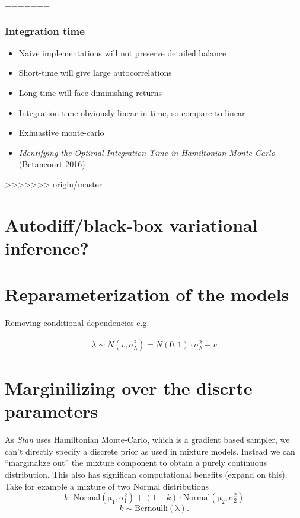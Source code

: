 \documentclass[11pt]{report}
\begin{document}
=======
\subsubsection{Integration time}

\begin{itemize}
\item Naive implementations will not preserve detailed balance
\item Short-time will give large autocorrelations
\item Long-time will face diminishing returns
\item Integration time obviously linear in time, so compare to linear
\item Exhuastive monte-carlo
\item \emph{Identifying the Optimal Integration Time in Hamiltonian Monte-Carlo} (Betancourt 2016)
\end{itemize}

>>>>>>> origin/master
\section{Autodiff/black-box variational inference?}

\section{Reparameterization of the models}

Removing conditional dependencies e.g.

\begin{align*}
\lambda \sim N(v, \sigma^2_\lambda) = N(0, 1) \cdot \sigma_\lambda^2 + v
\end{align*}

\section{Marginilizing over the discrte parameters}

As \emph{Stan} uses Hamiltonian Monte-Carlo, which is a gradient based sampler, we can't directly specify a discrete prior as used in mixture models. Instead we can ``marginalize out'' the mixture component to obtain a purely continuous distribution. This also has significan computational benefits (expand on this). \\

Take for example a mixture of two Normal distributions
\begin{equation}
  k \cdot \operatorname{Normal(\mu_1, \sigma_1^2)} + (1 - k) \cdot \operatorname{Normal(\mu_2, \sigma_2^2)}
\end{equation} 
\begin{equation}
  k \sim \operatorname{Bernoulli(\lambda)}.
\end{equation}
\end{document}
